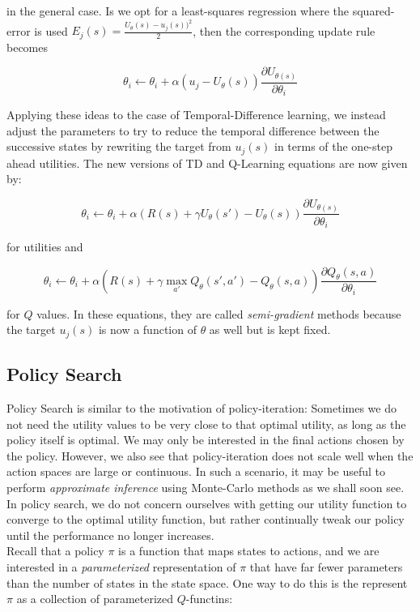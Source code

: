 \documentclass[11pt]{article}
\begin{document}
in the general case. Is we opt for a least-squares regression where the squared-error is used $E_j(s) = \frac{U_{\theta}(s) - u_j(s))^2}{2}$, then the corresponding update rule becomes

$$
\theta_i \leftarrow \theta_i + \alpha(u_j - U_{\theta}(s))\frac{\partial U_{\theta(s)}}{\partial \theta_i}
$$

Applying these ideas to the case of Temporal-Difference learning, we instead adjust the parameters to try to reduce the temporal difference between the successive states by rewriting the target from $u_j(s)$ in terms of the one-step ahead utilities. The new versions of TD and Q-Learning equations are now given by:

$$
\theta_i \leftarrow \theta_i + \alpha(R(s) + \gamma U_{\theta}(s') - U_{\theta}(s))\frac{\partial U_{\theta(s)}}{\partial \theta_i}
$$

for utilities and

$$
\theta_i \leftarrow \theta_i + \alpha(R(s) + \gamma \max_{a'} Q_{\theta}(s', a') - Q_{\theta}(s, a))\frac{\partial Q_{\theta}(s, a)}{\partial \theta_i}
$$

for $Q$ values. In these equations, they are called \textit{semi-gradient} methods because the target $u_j(s)$ is now a function of $\theta$ as well but is kept fixed.

\subsection{Policy Search}

Policy Search is similar to the motivation of policy-iteration: Sometimes we do not need the utility values to be very close to that optimal utility, as long as the policy itself is optimal. We may only be interested in the final actions chosen by the policy. However, we also see that policy-iteration does not scale well when the action spaces are large or continuous. In such a scenario, it may be useful to perform \textit{approximate inference} using Monte-Carlo methods as we shall soon see.\\

In policy search, we do not concern ourselves with getting our utility function to converge to the optimal utility function, but rather continually tweak our policy until the performance no longer increases.\\

Recall that a policy $\pi$ is a function that maps states to actions, and we are interested in a \textit{parameterized} representation of $\pi$ that have far fewer parameters than the number of states in the state space. One way to do this is the represent $\pi$ as a collection of parameterized $Q$-functins:
\end{document}
